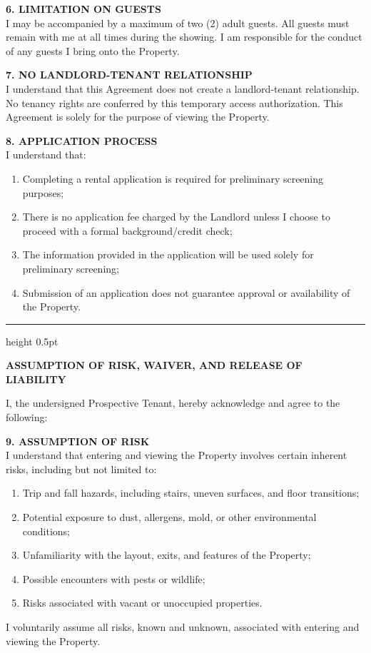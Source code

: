 \documentclass[11pt, letterpaper]{article}
\newcommand{\divider}{%
    \vspace{0.3em}%
    {\color{dividercolor}\hrule height 0.5pt}%
    \vspace{0.5em}%
}
\newcommand{\sectionheader}[1]{%
    \vspace{0.8em}%
    {\large\bfseries\color{headerblue}#1}%
    \vspace{0.3em}%
}
\begin{document}
\begin{Form}
\textbf{6. LIMITATION ON GUESTS}\\
I may be accompanied by a maximum of two (2) adult guests. All guests must remain with me at all times during the showing. I am responsible for the conduct of any guests I bring onto the Property.

\textbf{7. NO LANDLORD-TENANT RELATIONSHIP}\\
I understand that this Agreement does not create a landlord-tenant relationship. No tenancy rights are conferred by this temporary access authorization. This Agreement is solely for the purpose of viewing the Property.

\textbf{8. APPLICATION PROCESS}\\
I understand that:
\begin{enumerate}[label=\alph*), nosep, leftmargin=2em]
    \item Completing a rental application is required for preliminary screening purposes;
    \item There is no application fee charged by the Landlord unless I choose to proceed with a formal background/credit check;
    \item The information provided in the application will be used solely for preliminary screening;
    \item Submission of an application does not guarantee approval or availability of the Property.
\end{enumerate}

\divider

\sectionheader{ASSUMPTION OF RISK, WAIVER, AND RELEASE OF LIABILITY}

I, the undersigned Prospective Tenant, hereby acknowledge and agree to the following:

\textbf{9. ASSUMPTION OF RISK}\\
I understand that entering and viewing the Property involves certain inherent risks, including but not limited to:
\begin{enumerate}[label=\alph*), nosep, leftmargin=2em]
    \item Trip and fall hazards, including stairs, uneven surfaces, and floor transitions;
    \item Potential exposure to dust, allergens, mold, or other environmental conditions;
    \item Unfamiliarity with the layout, exits, and features of the Property;
    \item Possible encounters with pests or wildlife;
    \item Risks associated with vacant or unoccupied properties.
\end{enumerate}
I voluntarily assume all risks, known and unknown, associated with entering and viewing the Property.


\end{Form}
\end{document}
